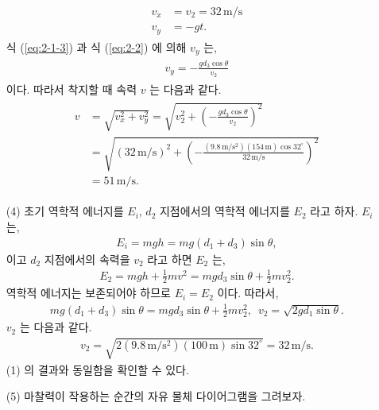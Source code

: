 \documentclass[floatfix,nofootinbib,superscriptaddress,fleqn]{revtex4-2}
\begin{document}
\begin{itemize}
\begin{align}
\begin{split}
      v_x &= v_2 = 32\,\mathrm{m/s}\\
      v_y &= -gt.
    \end{split}
  \end{align} 
  식 (\ref{eq:2-1-3}) 과 식 (\ref{eq:2-2}) 에 의해 $v_y$ 는,
  \begin{align}
    \begin{split}
      v_y = -\frac{gd_3\cos{\theta}}{v_2}
    \end{split}
  \end{align}
  이다. 따라서 착지할 때 속력 $v$ 는 다음과 같다.
  \begin{align}
    \begin{split}
      v &= \sqrt{v_x^2+v_y^2} = \sqrt{v_2^2+\left(
      -\frac{gd_3\cos{\theta}}{v_2}\right)^2} \\
      &= \sqrt{(32\,\mathrm{m/s})^2+\left(
        -\frac{(9.8\,\mathrm{m/s^2})(154\,\mathrm{m})
        \cos{32^\circ}}{32\,\mathrm{m/s}}\right)^2} \\
      &= 51\,\mathrm{m/s}.
      \end{split}
  \end{align}
  \item[(4)] 초기 역학적 에너지를 $E_i$, 
  $d_2$ 지점에서의 역학적 에너지를 $E_2$ 라고 하자. $E_i$ 는,
  \begin{align}
    E_i = mgh =mg\left(d_1+d_3\right)\sin{\theta},
  \end{align}
  이고 $d_2$ 지점에서의 속력을 $v_2$ 라고 하면 $E_2$ 는,
  \begin{align}
    E_2 = mgh + \frac{1}{2}mv^2
    = mgd_3\sin{\theta} + \frac{1}{2}mv_2^2.
  \end{align}
  역학적 에너지는 보존되어야 하므로 $E_i=E_2$ 이다. 따라서,
  \begin{align}
    mg\left(d_1+d_3\right)\sin{\theta}
    =mgd_3\sin{\theta} + \frac{1}{2}mv_2^2,\,\,\,
    v_2 = \sqrt{2gd_1\sin{\theta}}.
  \end{align}
  $v_2$ 는 다음과 같다.
  \begin{align}
    v_2 = \sqrt{2(9.8\,\mathrm{m/s^2})(100\,\mathrm{m})\sin{32^\circ}}
    = 32\,\mathrm{m/s}.
  \end{align} 
 (1) 의 결과와 동일함을 확인할 수 있다.
  \item[(5)] 
  마찰력이 작용하는 순간의 자유 물체 다이어그램을 그려보자. 
  \begin{figure}[h]
\end{figure}
\end{itemize}
\end{document}
